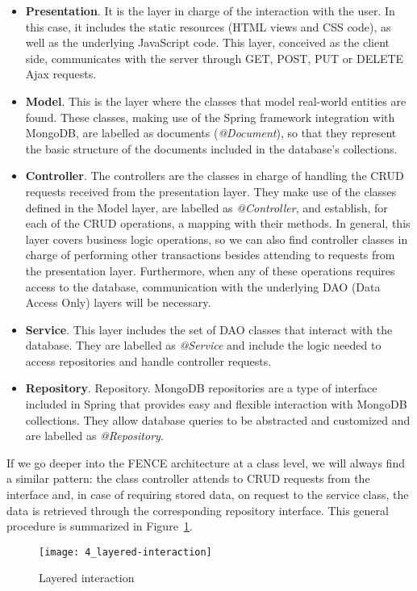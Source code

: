 \begin{itemize}
\item \textbf{Presentation}. It is the layer in charge of the interaction with the user. In this case, it includes the static resources (HTML views and CSS code), as well as the underlying JavaScript code. This layer, conceived as the client side, communicates with the server through GET, POST, PUT or DELETE Ajax requests.
\item \textbf{Model}. This is the layer where the classes that model real-world entities are found. These classes, making use of the Spring framework integration with MongoDB, are labelled as documents (\textit{@Document}), so that they represent the basic structure of the documents included in the database's collections.
\item \textbf{Controller}. The controllers are the classes in charge of handling the CRUD requests received from the presentation layer. They make use of the classes defined in the Model layer, are labelled as \textit{@Controller}, and establish, for each of the CRUD operations, a mapping with their methods. In general, this layer covers business logic operations, so we can also find controller classes in charge of performing other transactions besides attending to requests from the presentation layer. Furthermore, when any of these operations requires access to the database, communication with the underlying DAO (Data Access Only) layers will be necessary.
\item \textbf{Service}. This layer includes the set of DAO classes that interact with the database. They are labelled as \textit{@Service} and include the logic needed to access repositories and handle controller requests.
\item \textbf{Repository}. Repository. MongoDB repositories are a type of interface included in Spring that provides easy and flexible interaction with MongoDB collections. They allow database queries to be abstracted and customized and are labelled as \textit{@Repository}. 
\end{itemize}

If we go deeper into the FENCE architecture at a class level, we will always find a similar pattern: the class controller attends to CRUD requests from the interface and, in case of requiring stored data, on request to the service class, the data is retrieved through the corresponding repository interface. This general procedure is summarized in Figure~\ref{fig:layer_int}.

\begin{figure}
	\centering
	\texttt{[image: 4\_layered-interaction]}
	\caption[Layered interaction]{Layered interaction}
	\label{fig:layer_int}
\end{figure}

